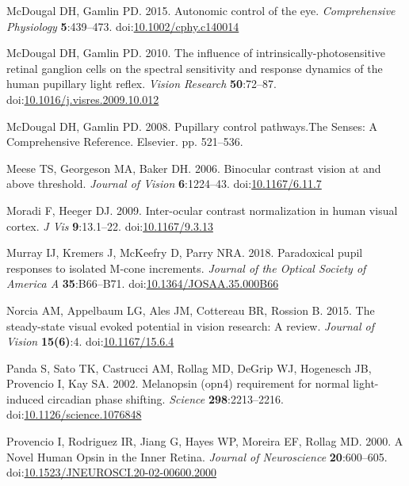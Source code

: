 \documentclass[
]{article}
\begin{document}
\leavevmode\hypertarget{ref-McDougal2015}{}%
McDougal DH, Gamlin PD. 2015. Autonomic control of the eye. \emph{Comprehensive Physiology} \textbf{5}:439--473. doi:\href{https://doi.org/10.1002/cphy.c140014}{10.1002/cphy.c140014}

\leavevmode\hypertarget{ref-McDougal2010}{}%
McDougal DH, Gamlin PD. 2010. The influence of intrinsically-photosensitive retinal ganglion cells on the spectral sensitivity and response dynamics of the human pupillary light reflex. \emph{Vision Research} \textbf{50}:72--87. doi:\href{https://doi.org/10.1016/j.visres.2009.10.012}{10.1016/j.visres.2009.10.012}

\leavevmode\hypertarget{ref-McDougal2008}{}%
McDougal DH, Gamlin PD. 2008. Pupillary control pathways.The Senses: A Comprehensive Reference. Elsevier. pp. 521--536.

\leavevmode\hypertarget{ref-Meese2006}{}%
Meese TS, Georgeson MA, Baker DH. 2006. Binocular contrast vision at and above threshold. \emph{Journal of Vision} \textbf{6}:1224--43. doi:\href{https://doi.org/10.1167/6.11.7}{10.1167/6.11.7}

\leavevmode\hypertarget{ref-Moradi2009}{}%
Moradi F, Heeger DJ. 2009. Inter-ocular contrast normalization in human visual cortex. \emph{J Vis} \textbf{9}:13.1--22. doi:\href{https://doi.org/10.1167/9.3.13}{10.1167/9.3.13}

\leavevmode\hypertarget{ref-Murray2018}{}%
Murray IJ, Kremers J, McKeefry D, Parry NRA. 2018. Paradoxical pupil responses to isolated M-cone increments. \emph{Journal of the Optical Society of America A} \textbf{35}:B66--B71. doi:\href{https://doi.org/10.1364/JOSAA.35.000B66}{10.1364/JOSAA.35.000B66}

\leavevmode\hypertarget{ref-Norcia2015}{}%
Norcia AM, Appelbaum LG, Ales JM, Cottereau BR, Rossion B. 2015. The steady-state visual evoked potential in vision research: A review. \emph{Journal of Vision} \textbf{15(6)}:4. doi:\href{https://doi.org/10.1167/15.6.4}{10.1167/15.6.4}

\leavevmode\hypertarget{ref-Panda2002}{}%
Panda S, Sato TK, Castrucci AM, Rollag MD, DeGrip WJ, Hogenesch JB, Provencio I, Kay SA. 2002. Melanopsin (opn4) requirement for normal light-induced circadian phase shifting. \emph{Science} \textbf{298}:2213--2216. doi:\href{https://doi.org/10.1126/science.1076848}{10.1126/science.1076848}

\leavevmode\hypertarget{ref-Provencio2000}{}%
Provencio I, Rodriguez IR, Jiang G, Hayes WP, Moreira EF, Rollag MD. 2000. A Novel Human Opsin in the Inner Retina. \emph{Journal of Neuroscience} \textbf{20}:600--605. doi:\href{https://doi.org/10.1523/JNEUROSCI.20-02-00600.2000}{10.1523/JNEUROSCI.20-02-00600.2000}
\end{document}
